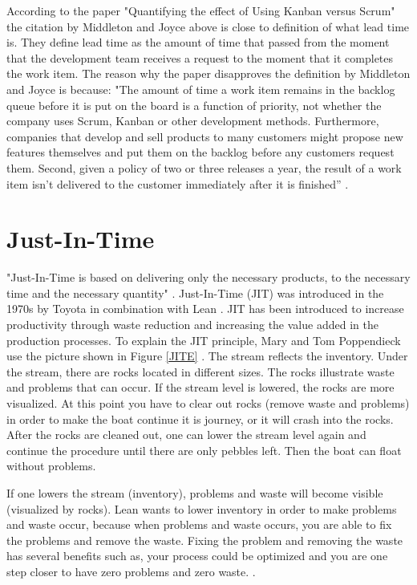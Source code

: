 \documentclass[UKenglish]{ifimaster}  %
\begin{document}
According to the paper "Quantifying the effect of Using Kanban versus Scrum" \parencite{Dag} the citation by Middleton and Joyce above is close to definition of what lead time is. They define lead time as the amount of time that passed from the moment that the development team receives a request to the moment that it completes the work item. The reason why the paper disapproves the definition by Middleton and Joyce is because: "The amount of time a work item remains in the backlog queue before it is put on the board is a function of priority, not whether the company uses Scrum, Kanban or other development methods. Furthermore, companies that develop and sell products to many customers might propose new features themselves and put them on the backlog before any customers request them. Second, given a policy of two or three releases a year, the result of a work item isn't delivered to the customer immediately after it is finished'' \parencite{Dag}.



\section{Just-In-Time}
"Just-In-Time is based on delivering only the necessary products, to the necessary time and the necessary quantity" \parencite{JIT}.
Just-In-Time (JIT) was introduced in the 1970s by Toyota in combination with Lean \parencite{javadian2013just}.  JIT has been introduced to increase productivity through waste reduction and increasing the value added in the production processes. To explain the JIT principle, Mary and Tom Poppendieck use the picture shown in Figure \ref{JITE}  \parencite{JIT} \parencite{Lean:2006}. The stream reflects the inventory.  Under the stream, there are rocks located in different sizes. The rocks illustrate waste and problems that can occur.  If the stream level is lowered, the rocks are more visualized. At this point you have to clear out rocks (remove waste and problems) in order to make the boat continue it is journey, or it will crash into the rocks. After the rocks are cleaned out, one can lower the stream level again and continue the procedure until there are only pebbles left. Then the boat can float without problems.

If one lowers the stream (inventory), problems and waste will become visible (visualized by rocks). Lean wants to lower inventory in order to make problems and waste occur, because when problems and waste occurs, you are able to fix the problems and remove the waste. Fixing the problem and removing the waste has several benefits such as, your process could be optimized and you are one step closer to have zero problems and zero waste.  \parencite{JIT} \parencite{Lean:2006}.
\end{document}
